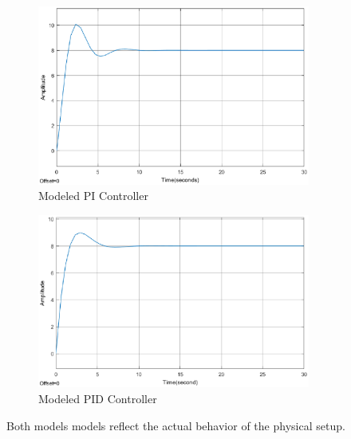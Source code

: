 \begin{figure}[ht]
	\centering
	\includegraphics[width=0.8\textwidth]{figures/06ModelValidation/modelPI.eps}
	\caption{Modeled PI Controller}
	\label{fig:modeledPI}
\end{figure}

\begin{figure}[ht]
	\centering
	\includegraphics[width=0.8\textwidth]{figures/06ModelValidation/modelPID.eps}
	\caption{Modeled PID Controller}
	\label{fig:modeledPI}
\end{figure}

Both models models reflect the actual behavior of the physical setup. 


